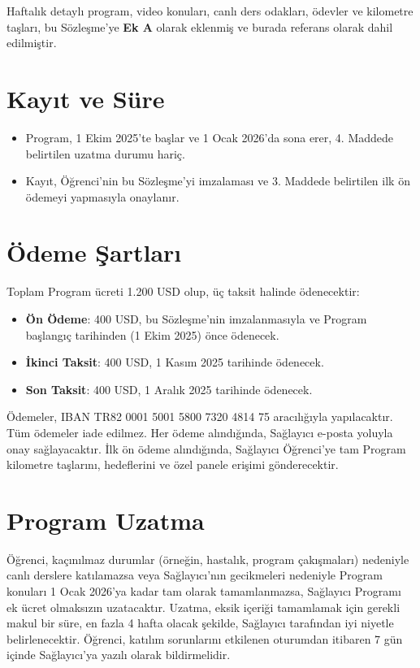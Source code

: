 \documentclass[a4paper,12pt]{article}
\begin{document}
Haftalık detaylı program, video konuları, canlı ders odakları, ödevler ve kilometre taşları, bu Sözleşme'ye \textbf{Ek A} olarak eklenmiş ve burada referans olarak dahil edilmiştir.

\section{Kayıt ve Süre}
\begin{itemize}[leftmargin=*]
    \item Program, 1 Ekim 2025'te başlar ve 1 Ocak 2026'da sona erer, 4. Maddede belirtilen uzatma durumu hariç.
    \item Kayıt, Öğrenci'nin bu Sözleşme'yi imzalaması ve 3. Maddede belirtilen ilk ön ödemeyi yapmasıyla onaylanır.
\end{itemize}

\section{Ödeme Şartları}
Toplam Program ücreti 1.200 USD olup, üç taksit halinde ödenecektir:
\begin{itemize}[leftmargin=*]
    \item \textbf{Ön Ödeme}: 400 USD, bu Sözleşme'nin imzalanmasıyla ve Program başlangıç tarihinden (1 Ekim 2025) önce ödenecek.
    \item \textbf{İkinci Taksit}: 400 USD, 1 Kasım 2025 tarihinde ödenecek.
    \item \textbf{Son Taksit}: 400 USD, 1 Aralık 2025 tarihinde ödenecek.
\end{itemize}

Ödemeler, IBAN TR82 0001 5001 5800 7320 4814 75 aracılığıyla yapılacaktır. Tüm ödemeler iade edilmez. Her ödeme alındığında, Sağlayıcı e-posta yoluyla onay sağlayacaktır. İlk ön ödeme alındığında, Sağlayıcı Öğrenci'ye tam Program kilometre taşlarını, hedeflerini ve özel panele erişimi gönderecektir.

\section{Program Uzatma}
Öğrenci, kaçınılmaz durumlar (örneğin, hastalık, program çakışmaları) nedeniyle canlı derslere katılamazsa veya Sağlayıcı'nın gecikmeleri nedeniyle Program konuları 1 Ocak 2026'ya kadar tam olarak tamamlanmazsa, Sağlayıcı Programı ek ücret olmaksızın uzatacaktır. Uzatma, eksik içeriği tamamlamak için gerekli makul bir süre, en fazla 4 hafta olacak şekilde, Sağlayıcı tarafından iyi niyetle belirlenecektir. Öğrenci, katılım sorunlarını etkilenen oturumdan itibaren 7 gün içinde Sağlayıcı'ya yazılı olarak bildirmelidir.
\end{document}
